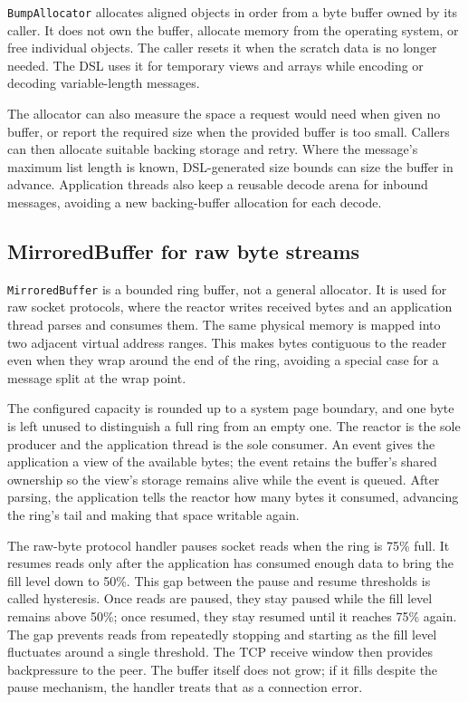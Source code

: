 \texttt{BumpAllocator} allocates aligned objects in order from a byte buffer
owned by its caller. It does not own the buffer, allocate memory from the
operating system, or free individual objects. The caller resets it when the
scratch data is no longer needed. The DSL uses it for temporary views and
arrays while encoding or decoding variable-length messages.

The allocator can also measure the space a request would need when given no
buffer, or report the required size when the provided buffer is too small.
Callers can then allocate suitable backing storage and retry. Where the
message's maximum list length is known, DSL-generated size bounds can size the
buffer in advance. Application threads also keep a reusable decode arena for
inbound messages, avoiding a new backing-buffer allocation for each decode.

\subsection{MirroredBuffer for raw byte streams}

\texttt{MirroredBuffer} is a bounded ring buffer, not a general allocator. It
is used for raw socket protocols, where the reactor writes received bytes and
an application thread parses and consumes them. The same physical memory is
mapped into two adjacent virtual address ranges. This makes bytes contiguous
to the reader even when they wrap around the end of the ring, avoiding a
special case for a message split at the wrap point.

The configured capacity is rounded up to a system page boundary, and one byte
is left unused to distinguish a full ring from an empty one. The reactor is
the sole producer and the application thread is the sole consumer. An event
gives the application a view of the available bytes; the event retains the
buffer's shared ownership so the view's storage remains alive while the event
is queued. After parsing, the application tells the reactor how many bytes it
consumed, advancing the ring's tail and making that space writable again.

The raw-byte protocol handler pauses socket reads when the ring is 75\% full.
It resumes reads only after the application has consumed enough data to bring
the fill level down to 50\%. This gap between the pause and resume thresholds
is called hysteresis. Once reads are paused, they stay paused while the fill
level remains above 50\%; once resumed, they stay resumed until it reaches
75\% again. The gap prevents reads from repeatedly stopping and starting as
the fill level fluctuates around a single threshold. The TCP receive window
then provides backpressure to the peer. The buffer itself does not grow; if it
fills despite the pause mechanism, the handler treats that as a connection
error.

